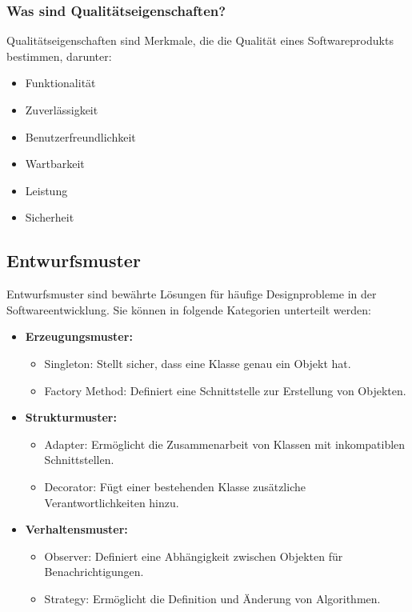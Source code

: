 \documentclass[main.tex]{subfiles}
\begin{document}
\subsubsection*{Was sind Qualitätseigenschaften?}
Qualitätseigenschaften sind Merkmale, die die Qualität eines Softwareprodukts bestimmen, darunter:
\begin{itemize}
    \item Funktionalität
    \item Zuverlässigkeit
    \item Benutzerfreundlichkeit
    \item Wartbarkeit
    \item Leistung
    \item Sicherheit
\end{itemize}

\subsection{\gls{Entwurfsmuster}}
\gls{Entwurfsmuster} sind bewährte Lösungen für häufige Designprobleme in der Softwareentwicklung. Sie können in folgende Kategorien unterteilt werden:

\begin{itemize}
    \item \textbf{\gls{Erzeugungsmuster}:}
    \begin{itemize}
        \item Singleton: Stellt sicher, dass eine Klasse genau ein Objekt hat.
        \item Factory Method: Definiert eine Schnittstelle zur Erstellung von Objekten.
    \end{itemize}
    
    \item \textbf{\gls{Strukturmuster}:}
    \begin{itemize}
        \item Adapter: Ermöglicht die Zusammenarbeit von Klassen mit inkompatiblen Schnittstellen.
        \item Decorator: Fügt einer bestehenden Klasse zusätzliche Verantwortlichkeiten hinzu.
    \end{itemize}
    
    \item \textbf{\gls{Verhaltensmuster}:}
    \begin{itemize}
        \item Observer: Definiert eine Abhängigkeit zwischen Objekten für Benachrichtigungen.
        \item Strategy: Ermöglicht die Definition und Änderung von Algorithmen.
    \end{itemize}
\end{itemize}
\end{document}
